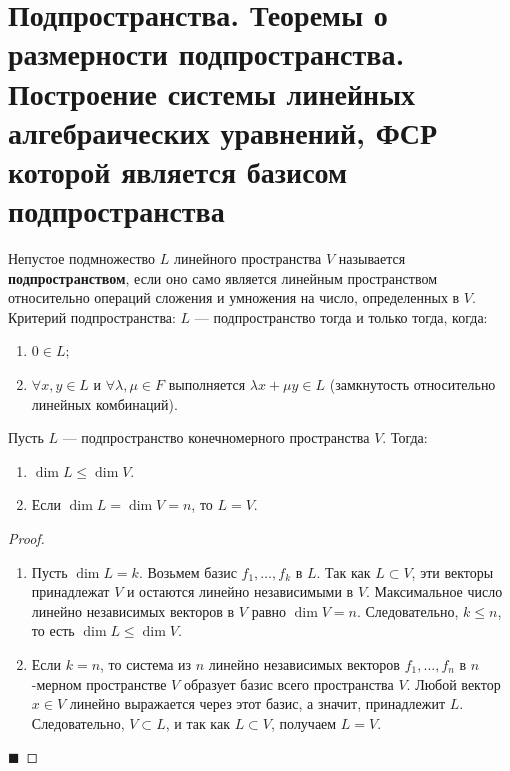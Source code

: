 \section{Подпространства. Теоремы о размерности подпространства. Построение системы линейных алгебраических уравнений, ФСР которой является базисом подпространства}

\begin{definition}
Непустое подмножество $L$ линейного пространства $V$ называется \textbf{подпространством}, если оно само является линейным пространством относительно операций сложения и умножения на число, определенных в $V$. 
Критерий подпространства: $L$ --- подпространство тогда и только тогда, когда:
\begin{enumerate}
    \item $0 \in L$;
    \item $\forall x, y \in L$ и $\forall \lambda, \mu \in F$ выполняется $\lambda x + \mu y \in L$ (замкнутость относительно линейных комбинаций).
\end{enumerate}
\end{definition}

\begin{theorem}
Пусть $L$ --- подпространство конечномерного пространства $V$. Тогда:
\begin{enumerate}
    \item $\dim L \le \dim V$.
    \item Если $\dim L = \dim V = n$, то $L = V$.
\end{enumerate}
\end{theorem}

\begin{proof}
\begin{enumerate}
    \item Пусть $\dim L = k$. Возьмем базис $f_1, \dots, f_k$ в $L$. Так как $L \subset V$, эти векторы принадлежат $V$ и остаются линейно независимыми в $V$. Максимальное число линейно независимых векторов в $V$ равно $\dim V = n$. Следовательно, $k \le n$, то есть $\dim L \le \dim V$.
    \item Если $k = n$, то система из $n$ линейно независимых векторов $f_1, \dots, f_n$ в $n$-мерном пространстве $V$ образует базис всего пространства $V$. Любой вектор $x \in V$ линейно выражается через этот базис, а значит, принадлежит $L$. Следовательно, $V \subset L$, и так как $L \subset V$, получаем $L = V$.
\end{enumerate}
\hfill$\blacksquare$
\end{proof}

